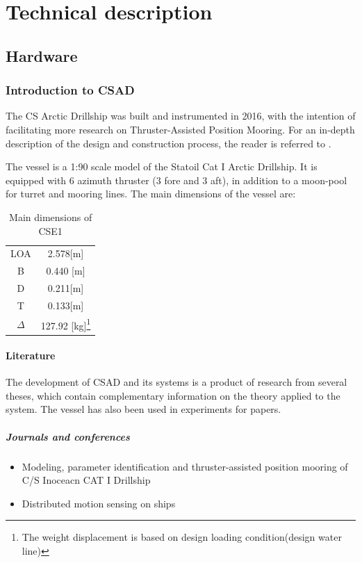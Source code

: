\part{Technical description}
\chapter{Hardware}
\section{Introduction to CSAD}
The CS Arctic Drillship was built and instrumented in 2016, with the intention of facilitating more research on Thruster-Assisted Position Mooring. For an in-depth description of the design and construction process, the reader is referred to \cite{bjorno2016thruster}. 

The vessel is a 1:90 scale model of the Statoil Cat I Arctic Drillship. It is equipped with 6 azimuth thruster (3 fore and 3 aft), in addition to a moon-pool for turret and mooring lines. The main dimensions of the vessel are:
\begin{table}[h!]
	\caption{Main dimensions of CSE1}
	\centering
	\begin{tabular}{cc}
		\hline
		LOA & 2.578[m]\\
		B & 0.440 [m]\\
		D & 0.211[m]\\
		T & 0.133[m]\\
		$\Delta$ & 127.92 [kg]\footnote{The weight displacement is based on design loading condition(design water line)}\\\hline
	\end{tabular}
\end{table}

\subsection{Literature}
The development of CSAD and its systems is a product of research from several theses, which contain complementary information on the theory applied to the system. The vessel has also been used in experiments for papers. 
\subsubsection{Journals and conferences}
\begin{itemize}
	\item Modeling, parameter identification and thruster-assisted position mooring of C/S Inoceacn CAT I Drillship \citep{bjorno2017}
	\item Distributed motion sensing on ships \citep{heyn2017}
\end{itemize}
